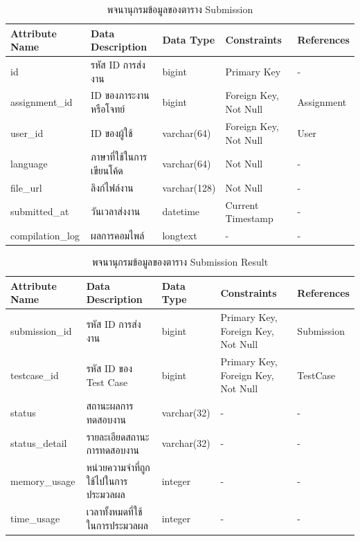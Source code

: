 \documentclass[12pt,oneside,openright,a4paper]{cpe-thai-project}
\begin{document}
    \begin{table}[!h]
        \centering
        \caption{พจนานุกรมข้อมูลของตาราง Submission}\label{tbl:data-dict-submission}
        \begin{tabular}{p{2cm}|p{4cm}p{2cm}p{3cm}p{2cm}} \hline\hline
            Attribute Name & Data Description & Data Type & Constraints & References \\ \hline\hline
            id & รหัส ID การส่งงาน & bigint & Primary Key & - \\
            assignment\_id & ID ของภาระงานหรือโจทย์ & bigint & Foreign Key, Not Null & Assignment \\
            user\_id & ID ของผู้ใช้ & varchar(64) & Foreign Key, Not Null & User \\
            language & ภาษาที่ใช้ในการเขียนโค้ด & varchar(64) & Not Null & - \\
            file\_url & ลิงก์ไฟล์งาน & varchar(128) & Not Null & - \\
            submitted\_at & วันเวลาส่งงาน & datetime & Current Timestamp & - \\
            compilation\_log & ผลการคอมไพล์ & longtext & - & - \\ \hline\hline
        \end{tabular}   
    \end{table}
     \begin{table}[!h]
        \centering
        \caption{พจนานุกรมข้อมูลของตาราง Submission Result}
        \label{tbl:data-dict-submission_result}
            \begin{tabular}{p{2cm}|p{4cm}p{2cm}p{3cm}p{2cm}} \hline\hline
            Attribute Name & Data Description & Data Type & Constraints & References \\ \hline\hline
            submission\_id & รหัส ID การส่งงาน & bigint & Primary Key, Foreign Key, Not Null & Submission \\
            testcase\_id & รหัส ID ของ Test Case & bigint & Primary Key, Foreign Key, Not Null & TestCase \\
            status & สถานะผลการทดสอบงาน & varchar(32) & - & - \\
            status\_detail & รายละเอียดสถานะการทดสอบงาน & varchar(32) & - & - \\
            memory\_usage & หน่วยความจำที่ถูกใช้ไปในการประมวลผล & integer & - & - \\
            time\_usage & เวลาทั้งหมดที่ใช้ในการประมวลผล & integer & - & - \\ \hline\hline
            \end{tabular}   
    \end{table}
    \pagebreak
\end{document}
